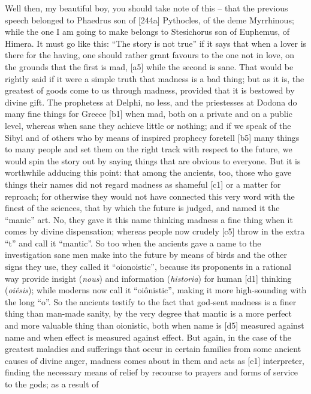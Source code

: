  Well then, my beautiful boy, you should take note of this --
that the previous speech belonged to Phaedrus son of {[}244a{]}
Pythocles, of the deme Myrrhinous; while the one I am going to make
belongs to Stesichorus son of Euphemus, of
Himera. It must go like
this: “The story is not true” if it says that when a lover is there for
the having, one should rather grant favours to the one not in love, on
the grounds that the first is mad, {[}a5{]} while the second is sane.
That would be rightly said if it were a simple truth that madness is a
bad thing; but as it is, the greatest of goods come to us through
madness, provided that it is bestowed by divine gift. The prophetess at
Delphi, no less, and the priestesses at Dodona do many fine things for
Greece {[}b1{]} when mad, both on a private and on a public level,
whereas when sane they achieve little or nothing; and if we speak of the
Sibyl and of others who by means of inspired prophecy foretell {[}b5{]}
many things to many people and set them on the right track with respect
to the future, we would spin the story out by saying things that are
obvious to everyone. But it is worthwhile adducing this point: that
among the ancients, too, those who gave things their names did not
regard madness as shameful {[}c1{]} or a matter for reproach; for
otherwise they would not have connected this very word with the finest
of the sciences, that by which the future is judged, and named it the
“manic” art. No, they gave it this name thinking madness a fine thing
when it comes by divine dispensation; whereas people now crudely
{[}c5{]} throw in the extra “t” and call it
“mantic”. So too when the
ancients gave a name to the investigation sane men make into the future
by means of birds and the other signs they use, they called it
“oionoistic”, because its proponents in a rational way provide insight
({\em nous}) and information ({\em historia}) for human {[}d1{]}
thinking ({\em oiêsis}); while moderns now call it “oiônistic”, making
it more high-sounding with the long “o”. So the ancients testify to the
fact that god-sent madness is a finer thing than man-made sanity, by the
very degree that mantic is a more perfect and more valuable thing than
oionistic, both when name is {[}d5{]} measured against name and when
effect is measured against effect. But again, in the case of the
greatest maladies and sufferings that occur in certain families from
some ancient causes of divine anger, madness comes about in them and
acts as {[}e1{]} interpreter, finding the necessary means of relief by
recourse to prayers and forms of service to the gods; as a result of
